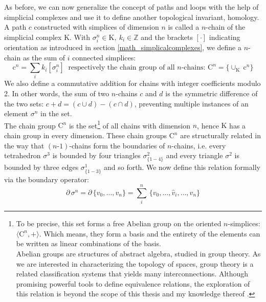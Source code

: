 As before, we can now generalize the concept of paths and loops with the help of simplicial complexes and use it to define another topological invariant, homology.\\
A path $c$ constructed with simplices of dimension $n$ is called a $n$-chain of the simplicial complex $\mathrm{K}$.
With $\sigma_{i}^{n} \in \mathrm{K}, ~k_{i} \in \mathbb{Z}$ and the brackets $[\cdot]$ indicating orientation as introduced in section \ref{math_simplicalcomplexes}, we define a $n$-chain as the sum of $i$ connected simplices:
\begin{equation}
	\mathrm{c}^{n} = \sum_{i} k_{i} [\sigma_{i}^{n}] ~\text{ respectively the chain group of all $n$-chains: } \mathrm{C}^{n} = \{ \cup_{\mathrm{K}} ~ \mathrm{c}^{n} \}
\end{equation}
We also define a commutative addition for chains with integer coefficients modulo 2.
In other words, the sum of two $n$-chains $c$ and $d$ is the symmetric difference of the two sets: $c+d = (c \cup d) - (c \cap d)$, preventing multiple instances of an element $\sigma^{n}$ in the set.\\
The chain group $\mathrm{C}^{n}$ is the set\footnote{ To be precise, this set forms a free Abelian group on the oriented $n$-simplices: $\langle \mathrm{C}^{n}, + \rangle$. Which means, they form a basis and the entirety of the elements can be written as linear combinations of the basis.\\ Abelian groups are structures of abstract algebra, studied in group theory. As we are interested in characterizing the topology of spaces, group theory is a related classification systems that yields many interconnections. Although promising powerful tools to define equivalence relations, the exploration of this relation is beyond the scope of this thesis and my knowledge thereof \citep[for an in depth introduction to the field of geometric group theory, see][]{Stillwell1993}.} of all chains with dimension $n$, hence $\mathrm{K}$ has a chain group in every dimension.
These chain groups $\mathrm{C}^{n}$ are structurally related in the way that $(n\text{-1})$-chains form the boundaries of $n$-chains, i.e. every tetrahedron $\sigma^{3}$ is bounded by four triangles $\sigma^{2}_{\{1-4\}}$ and every triangle $\sigma^{2}$ is bounded by three edges $\sigma_{\{1-3\}}^{1}$ and so forth.
We now define this relation formally via the boundary operator:
\begin{equation} \label{eq:boundary}
	\partial \,\sigma^{n} = \partial \,\{ v_{0}, \dots , v_{n} \} = \sum_{i}^{n} \,\{v_{0}, \dots, \hat{v}_{i}, \dots, v_{n}\}
\end{equation}
